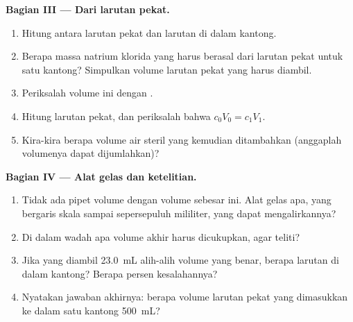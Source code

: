 \begin{problem}
\medskip
\noindent\textbf{Bagian III --- Dari larutan pekat.}
\begin{enumerate}[resume]
  \item Hitung  antara larutan pekat dan larutan di
        dalam kantong.
  \item Berapa massa natrium klorida yang harus berasal dari larutan pekat
        untuk satu kantong? Simpulkan volume larutan pekat yang harus
        diambil.
  \item Periksalah volume ini dengan .
  \item Hitung  larutan pekat, dan periksalah bahwa
        $c_0 V_0 = c_1 V_1$.
  \item Kira-kira berapa volume air steril yang kemudian ditambahkan
        (anggaplah volumenya dapat dijumlahkan)?
\end{enumerate}

\medskip
\noindent\textbf{Bagian IV --- Alat gelas dan ketelitian.}
\begin{enumerate}[resume]
  \item Tidak ada pipet volume dengan volume sebesar ini. Alat gelas apa,
        yang bergaris skala sampai sepersepuluh mililiter, yang dapat
        mengalirkannya?
  \item Di dalam wadah apa volume akhir harus dicukupkan, agar teliti?
  \item Jika yang diambil \qty{23.0}{mL} alih-alih volume yang benar,
        berapa  larutan di dalam kantong? Berapa persen
        kesalahannya?
  \item Nyatakan jawaban akhirnya: berapa volume larutan pekat yang
        dimasukkan ke dalam satu kantong \qty{500}{mL}?
\end{enumerate}
\end{problem}

